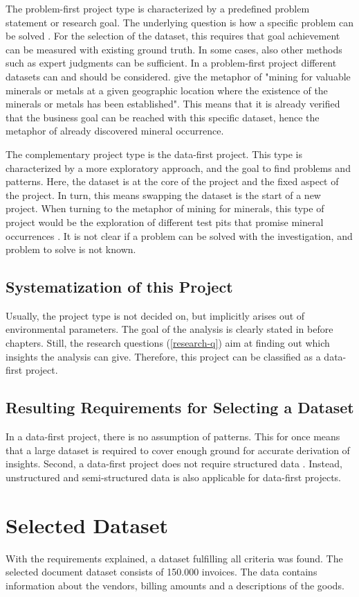 	The problem-first project type is characterized by a predefined problem statement or research goal. The underlying question is how a specific problem can be solved \cite{dataScienceProjectTypes}.  For the selection of the dataset, this requires that goal achievement can be measured with existing ground truth. In some cases, also other methods such as expert judgments can be sufficient. In a problem-first project different datasets can and should be considered. \cite{dataScienceProjectTypes} give the metaphor of "mining for valuable minerals or metals at a given geographic location where the existence of the minerals or metals has been established". This means that it is already verified that the business goal can be reached with this specific dataset, hence the metaphor of already discovered mineral occurrence.
	
	The complementary project type is the data-first project. This type is characterized by a more exploratory approach, and the goal to find problems and patterns. Here, the dataset is at the core of the project and the fixed aspect of the project. In turn, this means swapping the dataset is the start of a new project. When turning to the metaphor of mining for minerals, this type of project would be the exploration of different test pits that promise mineral occurrences \cite{dataScienceProjectTypes}. It is not clear if a problem can be solved with the investigation, and problem to solve is not known.
	
	\subsection{Systematization of this Project}
	Usually, the project type is not decided on, but implicitly arises out of environmental parameters. The goal of the analysis is clearly stated in before chapters. Still, the research questions (\ref{research-q}) aim at finding out which insights the analysis can give. Therefore, this project can be classified as a data-first project.
	
	\subsection{Resulting Requirements for Selecting a Dataset}
	In a data-first project, there is no assumption of patterns. This for once means that a large dataset is required to cover enough ground for accurate derivation of insights. Second, a data-first project does not require structured data \cite{srivastavaDataMining}. Instead, unstructured and semi-structured data is also applicable for data-first projects.
	
	
	\section{Selected Dataset}
	With the requirements explained, a dataset fulfilling all criteria was found. The selected document dataset consists of 150.000 invoices. The data contains information about the vendors, billing amounts and a descriptions of the goods. 
	
	

